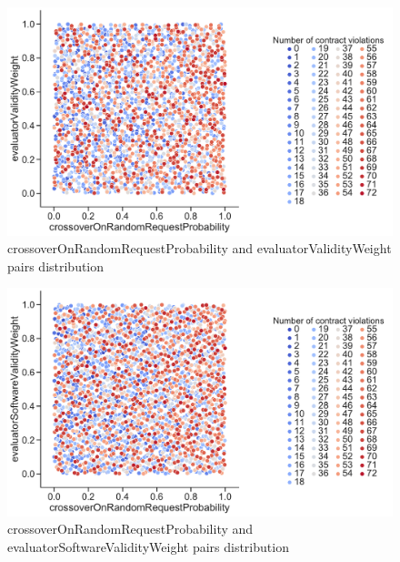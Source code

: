 \begin{figure}
	\centering
	\includegraphics[width=\textwidth]{images/PairsDistr/crossoverOnRandomRequestProbability_evaluatorValidityWeight.pdf}
	\caption[crossoverOnRandomRequestProbability and evaluatorValidityWeight pairs distribution]{crossoverOnRandomRequestProbability and evaluatorValidityWeight pairs distribution}
	\label{fig:crossoverOnRandomRequestProbability_evaluatorValidityWeight_pair}
\end{figure}
\clearpage
\begin{figure}
	\centering
	\includegraphics[width=\textwidth]{images/PairsDistr/crossoverOnRandomRequestProbability_evaluatorSoftwareValidityWeight.pdf}
	\caption[crossoverOnRandomRequestProbability and evaluatorSoftwareValidityWeight pairs distribution]{crossoverOnRandomRequestProbability and evaluatorSoftwareValidityWeight pairs distribution}
	\label{fig:crossoverOnRandomRequestProbability_evaluatorSoftwareValidityWeight_pair}
\end{figure}
\clearpage
